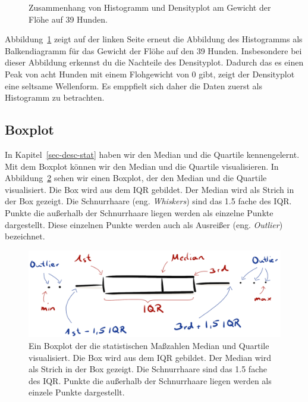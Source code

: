 \documentclass[
  letterpaper,
  DIV=11,
  oneside]{scrreport}
\begin{document}
\begin{figure}
\begin{minipage}[t]{0.50\linewidth}
{{}

}

\end{minipage}%

\caption{\label{fig-dens-flea-2}Zusammenhang von Histogramm und
Densityplot am Gewicht der Flöhe auf 39 Hunden.}

\end{figure}

Abbildung~\ref{fig-dens-flea-2} zeigt auf der linken Seite erneut die
Abbildung des Histogramms als Balkendiagramm für das Gewicht der Flöhe
auf den 39 Hunden. Insbesondere bei dieser Abbildung erkennst du die
Nachteile des Densityplot. Dadurch das es einen Peak von acht Hunden mit
einem Flohgewicht von 0 gibt, zeigt der Densityplot eine seltsame
Wellenform. Es emppfielt sich daher die Daten zuerst als Histogramm zu
betrachten.

\hypertarget{sec-eda-boxplot}{%
\subsection{Boxplot}\label{sec-eda-boxplot}}

In Kapitel~\ref{sec-desc-stat} haben wir den Median und die Quartile
kennengelernt. Mit dem Boxplot können wir den Median und die Quartile
visualisieren. In Abbildung~\ref{fig-boxplot-drawn} sehen wir einen
Boxplot, der den Median und die Quartile visualisiert. Die Box wird aus
dem IQR gebildet. Der Median wird als Strich in der Box gezeigt. Die
Schnurrhaare (eng. \emph{Whiskers}) sind das 1.5 fache des IQR. Punkte
die außerhalb der Schnurrhaare liegen werden als einzelne Punkte
dargestellt. Diese einzelnen Punkte werden auch als Ausreißer (eng.
\emph{Outlier}) bezeichnet.

\begin{figure}

{\centering \includegraphics[width=1\textwidth,height=\textheight]{./images/boxplot-drawn.png}

}

\caption{\label{fig-boxplot-drawn}Ein Boxplot der die statistischen
Maßzahlen Median und Quartile visualisiert. Die Box wird aus dem IQR
gebildet. Der Median wird als Strich in der Box gezeigt. Die
Schnurrhaare sind das 1.5 fache des IQR. Punkte die außerhalb der
Schnurrhaare liegen werden als einzele Punkte dargestellt.}

\end{figure}
\end{document}
